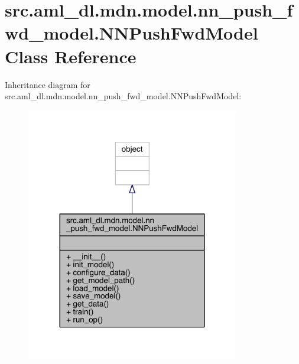 \hypertarget{classsrc_1_1aml__dl_1_1mdn_1_1model_1_1nn__push__fwd__model_1_1_n_n_push_fwd_model}{}\section{src.\+aml\+\_\+dl.\+mdn.\+model.\+nn\+\_\+push\+\_\+fwd\+\_\+model.\+N\+N\+Push\+Fwd\+Model Class Reference}
\label{classsrc_1_1aml__dl_1_1mdn_1_1model_1_1nn__push__fwd__model_1_1_n_n_push_fwd_model}


Inheritance diagram for src.\+aml\+\_\+dl.\+mdn.\+model.\+nn\+\_\+push\+\_\+fwd\+\_\+model.\+N\+N\+Push\+Fwd\+Model\+:\nopagebreak
\begin{figure}[H]
\begin{center}
\leavevmode
\includegraphics[width=263pt]{classsrc_1_1aml__dl_1_1mdn_1_1model_1_1nn__push__fwd__model_1_1_n_n_push_fwd_model__inherit__graph}
\end{center}
\end{figure}


